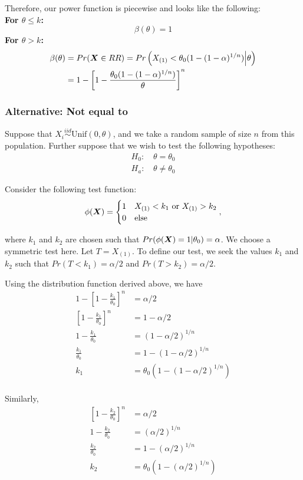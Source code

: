 \documentclass[]{article}
\newcommand{\bfX}{\mbox{\boldmath $X$}}
\begin{document}
Therefore, our power function is piecewise and looks like the following:\\
\textbf{For $\theta \leq k$:}
\[
\beta(\theta) = 1
\]
\textbf{For $\theta > k$:}
\[
\begin{split}
\beta(\theta) &= Pr(\bfX \in RR) = Pr\left(X_{(1)} < \theta_0(1 - (1 - \alpha)^{1/n}) \Big| \theta\right) \\
&= 1 - \left[1 - \frac{\theta_0(1 - (1 - \alpha)^{1/n})}{\theta}\right]^n
\end{split}
\]

\subsubsection{Alternative: Not equal to}

Suppose that $X_i \stackrel{iid}{\sim} \text{Unif}(0, \theta)$, and we take a random sample of size $n$ from this population. Further suppose that we wish to test the following hypotheses:
\[
\begin{split}
\text{$H_0$: }& \theta = \theta_0 \\
\text{$H_a$: }& \theta \neq \theta_0
\end{split}
\]

Consider the following test function:
\[
\phi(\bfX) = \begin{cases}
1 & X_{(1)} < k_1 \text{ or } X_{(1)} > k_2 \\
0 & \text{else}
\end{cases},
\]

where $k_1$ and $k_2$ are chosen such that $Pr(\phi(\bfX) = 1|\theta_0) = \alpha$. We choose a symmetric test here. Let $T = X_{(1)}$. To define our test, we seek the values $k_1$ and $k_2$ such that $Pr(T < k_1) = \alpha/2$ and $Pr(T > k_2) = \alpha/2$.

Using the distribution function derived above, we have
\[
\begin{split}
1 - \left[1 - \frac{k_1}{\theta_0}\right]^n &= \alpha/2 \\
\left[1 - \frac{k_1}{\theta_0}\right]^n &= 1 - \alpha/2 \\
1 - \frac{k_1}{\theta_0} &= (1 - \alpha/2)^{1/n} \\
\frac{k_1}{\theta_0} &= 1 - (1 - \alpha/2)^{1/n} \\
k_1 &= \theta_0(1 - (1 - \alpha/2)^{1/n}) \\
\end{split}
\]

Similarly, 
\[
\begin{split}
\left[1 - \frac{k_2}{\theta_0}\right]^n &= \alpha/2 \\
1 - \frac{k_2}{\theta_0} &= (\alpha/2)^{1/n} \\
\frac{k_2}{\theta_0} &= 1 - (\alpha/2)^{1/n} \\
k_2 &= \theta_0(1 - (\alpha/2)^{1/n})
\end{split}
\]
\end{document}
